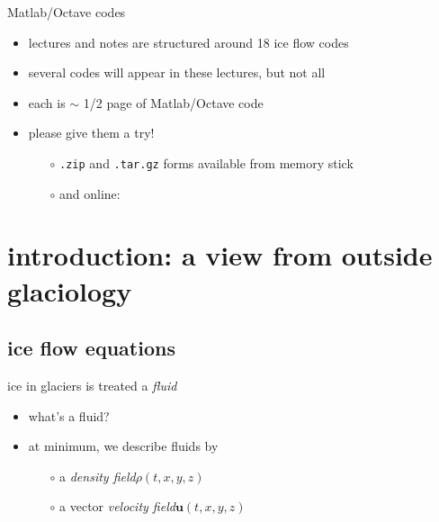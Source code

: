 \begin{frame}{Matlab/Octave codes}

\begin{itemize}
\item lectures and notes are structured around 18 ice flow codes
\item several codes will appear in these lectures, but not all
\item each is $\sim$ 1/2 page of Matlab/Octave code
\item please give them a try!

  \begin{itemize}
  \item[$\circ$] \texttt{.zip} and \texttt{.tar.gz} forms available from memory stick
  \item[$\circ$] and online:

  \bigskip\bigskip\small
  \centerline{}
  
  \end{itemize}
\end{itemize}
\end{frame}


\section[introduction]{introduction: a view from outside glaciology}

\subsection{ice flow equations}

\begin{frame}{ice in glaciers is treated a \emph{fluid}}

\begin{itemize}
\item what's a fluid?

\bigskip\bigskip
\item<2> at minimum, we describe fluids by
  \begin{itemize}
  \item[$\circ$] a \emph{density field}\quad $\rho(t,x,y,z)$
  \item[$\circ$] a vector \emph{velocity field}\quad $\mathbf{u}(t,x,y,z)$
  \end{itemize}
\end{itemize}
\end{frame}



